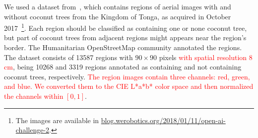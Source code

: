 \documentclass[journal, twoside]{IEEEtran}
\begin{document}
We used a dataset from~\cite{8899005}, which contains regions of aerial images with and without coconut trees from the Kingdom of Tonga, as acquired in October 2017~\footnote{The images are available in \url{blog.werobotics.org/2018/01/11/open-ai-challenge-2}.}. Each region should be classified as containing one or none coconut tree, but part of coconut trees from adjacent regions might appears near the region's border. The Humanitarian OpenStreetMap community annotated the regions. The dataset consists of 13587 regions with $90 \times 90$ pixels \textcolor{red}{with spatial resolution $8$\si{\centi\metre}}, being 10268 and 3319 regions annotated as containing and not containing coconut trees, respectively. \textcolor{red}{The region images contain three channels: red, green, and blue. We converted them to the CIE L*a*b* color space and then normalized the channels within $[0,1]$}.
\end{document}
